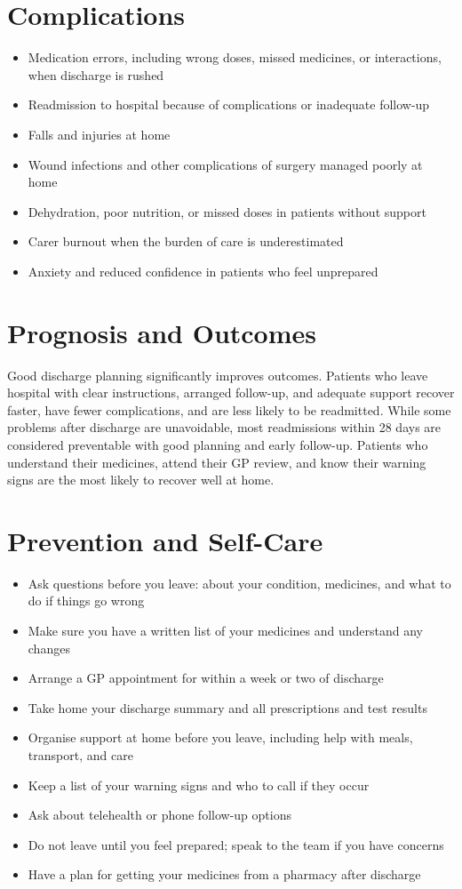 \section*{Complications}
\begin{itemize}
    \item Medication errors, including wrong doses, missed medicines, or interactions, when discharge is rushed
    \item Readmission to hospital because of complications or inadequate follow-up
    \item Falls and injuries at home
    \item Wound infections and other complications of surgery managed poorly at home
    \item Dehydration, poor nutrition, or missed doses in patients without support
    \item Carer burnout when the burden of care is underestimated
    \item Anxiety and reduced confidence in patients who feel unprepared
\end{itemize}

\section*{Prognosis and Outcomes}
Good discharge planning significantly improves outcomes. Patients who leave hospital with clear instructions, arranged follow-up, and adequate support recover faster, have fewer complications, and are less likely to be readmitted. While some problems after discharge are unavoidable, most readmissions within 28 days are considered preventable with good planning and early follow-up. Patients who understand their medicines, attend their GP review, and know their warning signs are the most likely to recover well at home.

\section*{Prevention and Self-Care}
\begin{itemize}
    \item Ask questions before you leave: about your condition, medicines, and what to do if things go wrong
    \item Make sure you have a written list of your medicines and understand any changes
    \item Arrange a GP appointment for within a week or two of discharge
    \item Take home your discharge summary and all prescriptions and test results
    \item Organise support at home before you leave, including help with meals, transport, and care
    \item Keep a list of your warning signs and who to call if they occur
    \item Ask about telehealth or phone follow-up options
    \item Do not leave until you feel prepared; speak to the team if you have concerns
    \item Have a plan for getting your medicines from a pharmacy after discharge
\end{itemize}

